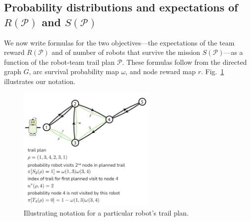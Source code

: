 \documentclass[fleqn,10pt,lineno]{wlpeerj}
\begin{document}
\subsection{Probability distributions and expectations of $R(\mathcal{P})$ and $S(\mathcal{P})$}
We now write formulas for the two objectives---the expectations of the team reward $R(\mathcal{P})$ and of number of robots that survive the mission $S(\mathcal{P})$---as a function of the robot-team trail plan $\mathcal{P}$. 
These formulas follow from the directed graph $G$, arc survival probability map $\omega$, and node reward map $r$. Fig.~\ref{fig:notation} illustrates our notation.

\begin{figure}[h!]
    \centering
    	\includegraphics[width=0.6\textwidth]{notation.pdf}
    \caption{Illustrating notation for a particular robot's trail plan.} \label{fig:notation}
\end{figure}
\end{document}
